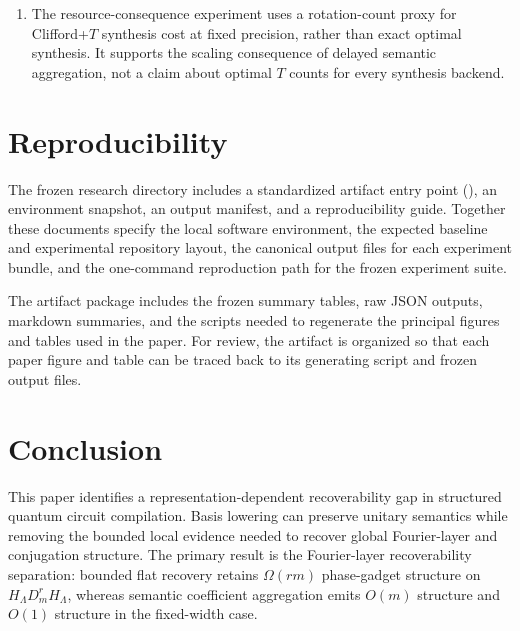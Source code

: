 \documentclass[11pt]{article}
\begin{document}
\begin{enumerate}[leftmargin=1.5em]
    \item The resource-consequence experiment uses a rotation-count proxy for Clifford+$T$ synthesis cost at fixed precision, rather than exact optimal synthesis. It supports the scaling consequence of delayed semantic aggregation, not a claim about optimal $T$ counts for every synthesis backend.
\end{enumerate}

\section{Reproducibility}
\label{sec:reproducibility}

The frozen research directory includes a standardized artifact entry point
(), an environment snapshot, an output manifest,
and a reproducibility guide. Together these documents specify the local software
environment, the expected baseline and experimental repository layout, the
canonical output files for each experiment bundle, and the one-command
reproduction path for the frozen experiment suite.

The artifact package includes the frozen summary tables, raw JSON outputs,
markdown summaries, and the scripts needed to regenerate the principal figures
and tables used in the paper. For review, the artifact is organized so that each
paper figure and table can be traced back to its generating script and frozen
output files.

\section{Conclusion}
\label{sec:conclusion}

This paper identifies a representation-dependent recoverability gap in
structured quantum circuit compilation. Basis lowering can preserve unitary
semantics while removing the bounded local evidence needed to recover global
Fourier-layer and conjugation structure. The primary result is the
Fourier-layer recoverability separation: bounded flat recovery retains
$\Omega(rm)$ phase-gadget structure on $H_{\Lambda}D_m^rH_{\Lambda}$, whereas
semantic coefficient aggregation emits $O(m)$ structure and $O(1)$ structure in
the fixed-width case.
\end{document}
